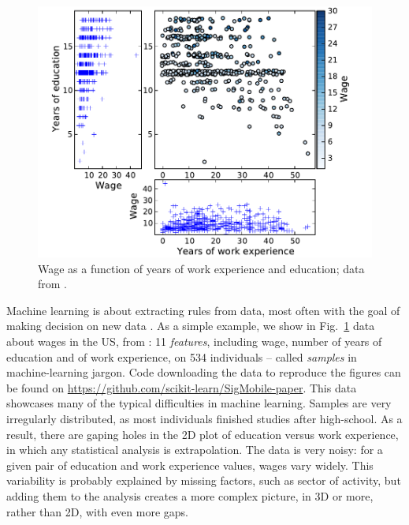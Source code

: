 \documentclass[a4paper]{article}
\begin{document}
\begin{figure}[b]
    \includegraphics[width=1.05\linewidth]{wage_data}%

    \caption{Wage as a function of years of work experience and
    education; data from \cite{berndt1991}\label{fig:data}.}
\end{figure}

Machine learning is about extracting rules from data, most often with the
goal of making decision on new data \cite{elemstatlearn}. As a simple example, we show in
Fig.~\ref{fig:data} data about wages in the US, from \cite{berndt1991}:
11 \emph{features}, including wage, number of years of education and of work
experience, on 534 individuals -- called \emph{samples} in machine-learning
jargon.
Code downloading the data to reproduce the figures can be found on
\url{https://github.com/scikit-learn/SigMobile-paper}.
%
This data showcases many of the typical difficulties in machine learning.
Samples are very irregularly distributed, as most individuals
finished studies after high-school. As a result, there are gaping
holes in the 2D plot of education versus work experience, in which any
statistical analysis is extrapolation. The data is very noisy: for a
given pair of education and work experience values, wages vary widely.
This variability
is probably explained by missing factors, such as sector of
activity, but adding them to the analysis creates a more complex picture,
in 3D or more, rather than 2D, with even more gaps.
\end{document}

